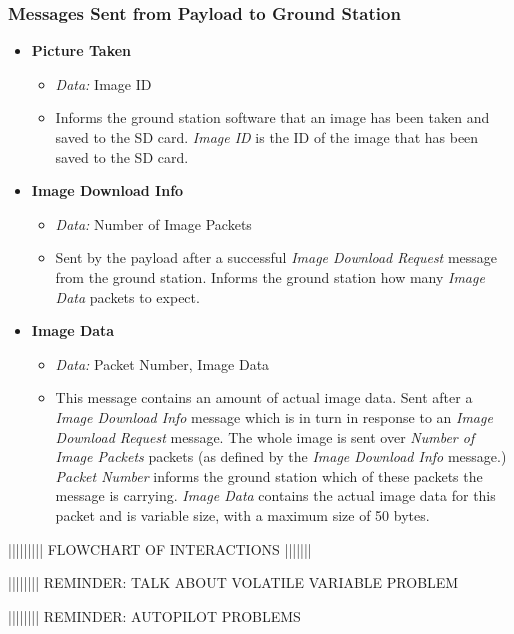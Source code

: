 \subsubsection*{Messages Sent from Payload to Ground Station}

\begin{itemize}

\item \textbf{Picture Taken}

\begin{itemize}
\item \emph{Data:} Image ID

\item Informs the ground station software that an image has been taken and 
saved to the SD card. \emph{Image ID} is the ID of the image that has been 
saved to the SD card.
\end{itemize} 

\item \textbf{Image Download Info}

\begin{itemize}

\item \emph{Data:} Number of Image Packets

\item Sent by the payload after a successful \emph{Image Download Request}
message from the ground station. Informs the ground station how many 
\emph{Image Data} packets to expect.
\end{itemize}

\item \textbf{Image Data} 
\begin{itemize}
\item \emph{Data:} Packet Number, Image Data
\item This message contains an amount of actual image data. Sent after a
\emph{Image Download Info} message which is in turn in response to an 
\emph{Image Download Request} message. The whole image is sent over
\emph{Number of Image Packets} packets (as defined by the \emph{Image Download
Info} message.) \emph{Packet Number} informs the ground station which of these
packets the message is carrying. \emph{Image Data} contains the actual image 
data for this packet and is variable size, with a maximum size of 50 bytes. 
\end{itemize}

\end{itemize}


||||||||| FLOWCHART OF INTERACTIONS |||||||


|||||||| REMINDER: TALK ABOUT VOLATILE VARIABLE PROBLEM

|||||||| REMINDER: AUTOPILOT PROBLEMS

